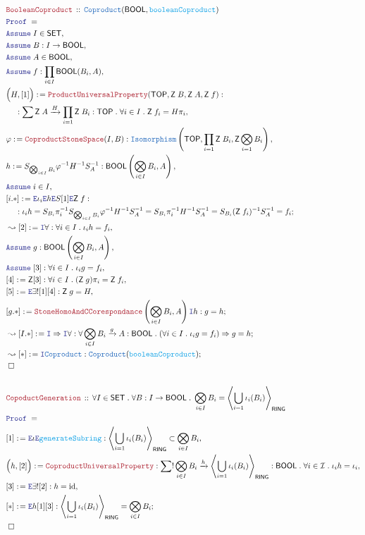 \documentclass[12pt]{scrartcl}
\newcommand{\TYPE}[1]{\textcolor{NavyBlue}{\mathtt{#1}}}
\newcommand{\FUNC}[1]{\textcolor{Cerulean}{\mathtt{#1}}}
\newcommand{\LOGIC}[1]{\textcolor{Blue}{\mathtt{#1}}}
\newcommand{\THM}[1]{\textcolor{Maroon}{\mathtt{#1}}}
\renewcommand{\.}{\; . \;}
\newcommand{\de}{: \kern 0.1pc =}
\newcommand{\Theorem}[2]{& \THM{#1} \, :: \, #2 \\ & \Proof = \\ }
\newcommand{\NewLine}{\\ & \kern 1pc}
\newcommand{\Page}[1]{ \begin{align*} #1 \end{align*}   }
\newcommand{\Imply}{\Rightarrow}
\newcommand{\Intro}{\LOGIC{I}}
\newcommand{\Elim}{\LOGIC{E}}
\DeclareMathOperator*{\id}{id}
\newcommand{\Arrow}{\xrightarrow}
\newcommand{\Say}[3]{& #1 \de #2 : #3, \\}
\newcommand{\Conclude}[3]{& #1 \de #2 : #3; \\}
\newcommand{\Derive}[3]{& \leadsto #1 \de #2 : #3, \\}
\newcommand{\DeriveConclude}[3]{& \leadsto #1 \de #2 : #3 ; \\}
\newcommand{\Assume}[2]{& \LOGIC{Assume} \; #1 : #2, \\}
\newcommand{\AssumeIn}[2]{& \LOGIC{Assume} \; #1 \in #2, \\}
\newcommand{\QED}{\; \square}
\newcommand{\EndProof}{& \QED \\}
\newcommand{\Proof}{\LOGIC{Proof} \; }
\newcommand{\I}{\mathcal{I}}
\newcommand{\SET}{\mathsf{SET}}
\newcommand{\RING}{\mathsf{RING}}
\newcommand{\TOP}{\mathsf{TOP}}
\newcommand{\BOOL}{\mathsf{BOOL}}
\newcommand{\Z}{\mathsf{Z}}
\begin{document}
\Page{
	\Theorem{BooleanCoproduct}
	{
		\TYPE{Coproduct}(\BOOL,\FUNC{booleanCoproduct})		
	}
	\AssumeIn{I}{\SET}
	\Assume{B}{I \to \BOOL}
	\AssumeIn{A}{\BOOL}
	\Assume{f}{\prod_{i \in I}\BOOL(B_i,A)}
	\Say{\Big(H,[1]\Big)}
	{
		\THM{ProductUniversalProperty}
		(
			\TOP,
			\Z\;B,
			\Z\;A,
			\Z\;f
		)
	}
	{
		\NewLine :		
		\sum \Z\;A \Arrow{H} \prod_{i=1}\Z\;B_i : \TOP \.
		\forall i \in I \. \Z\;f_i = H \pi_i
	}
	\Say{\varphi}{\THM{CoproductStoneSpace}(I,B)}
	{
		\TYPE{Isomorphism}\left(\TOP, \prod_{i=1} \Z\;B_i,\Z \bigotimes_{i=1} B_i \right)
	}
	\Say{h}{S_{\bigotimes_{i \in I} B_i}\varphi^{-1}H^{-1}S^{-1}_A}
	{\BOOL\left(\bigotimes_{i\in I} B_i,A\right)}
	\AssumeIn{i}{I}	
	\Conclude{[i.*]}{
		\Elim \iota_i \Elim h
		\Elim S
		[1]
		\Elim 
		\Z \; f
	}
	{
		\NewLine :
		\iota_i h =
		S_{B_i} \pi_i^{-1} S_{\bigotimes_{i\in I} B_i} \varphi^{-1}H^{-1}S^{-1}_A =
		S_{B_i} \pi_i^{-1} H^{-1}S^{-1}_A =
		S_{B_i} (\Z \; f_i)^{-1} S^{-1}_A = 
		f_i
	}
	\Derive{[2]}{\Intro \forall}
	{
		\forall i \in I \. 
		\iota_i h = f_i
	}
	\Assume{g}{\BOOL\left(\bigotimes_{i \in I} B_i,  A\right)}
	\Assume{[3]}{\forall i \in I \. \iota_i g = f_i}
	\Say{[4]}{\Z[3]}
	{
		\forall i \in I \.		
		(\Z \; g)\pi_i = \Z \;f_i
	}
	\Say{[5]}{\Elim \exists! [1][4]}{\Z \; g = H}
	\Conclude{[g.*]}{ 
		\THM{StoneHomoAndCCorespondance}\left( 
			\bigotimes_{i \in I} B_i, A  \right) 
		\Intro h   
	}{g = h}
	\DeriveConclude{[I.*]}{\Intro \Imply \Intro \forall}
	{
		\forall  \bigotimes_{i \in I} B_i \Arrow{g} A : \BOOL \.
		(\forall i \in I \. \iota_i g = f_i) 
		\Imply
		g = h 
	}	
	\DeriveConclude{[*]}{\Intro \TYPE{Coproduct}}
	{
		\TYPE{Coproduct}(\FUNC{booleanCoproduct})
	}
	\EndProof
	\\
	\Theorem{CopoductGeneration}
	{
		\forall I \in \SET \.
		\forall B : I \to \BOOL \.
		\bigotimes_{i \in I} B_i = \left\langle \bigcup_{i=1} \iota_i(B_i) \right\rangle_{\RING}
	}
	\Say{[1]}{\Elim \iota \Elim \FUNC{generateSubring}}
	{
		\left\langle \bigcup_{i=1} \iota_i(B_i) \right\rangle_{\RING} \subset 
		\bigotimes_{i \in I} B_i
	}
	\Say{\Big(h,[2]\Big)}{\THM{CoproductUniversalProperty}}
	{
		\sum! \bigotimes_{i \in I} B_i \Arrow{h} 
		\left\langle \bigcup_{i=1} \iota_i(B_i) \right\rangle_{\RING} : \BOOL \.
		\forall i \in \I \. \iota_i h = \iota_i
	}
	\Say{[3]}{\Elim \exists ! [2]}{ h = \id}
	\Conclude{[*]}{\Elim h [1][3]}
	{
		\left\langle \bigcup_{i=1} \iota_i(B_i) \right\rangle_{\RING} = 
		\bigotimes_{i \in I} B_i
	}
	\EndProof
}
\end{document}
